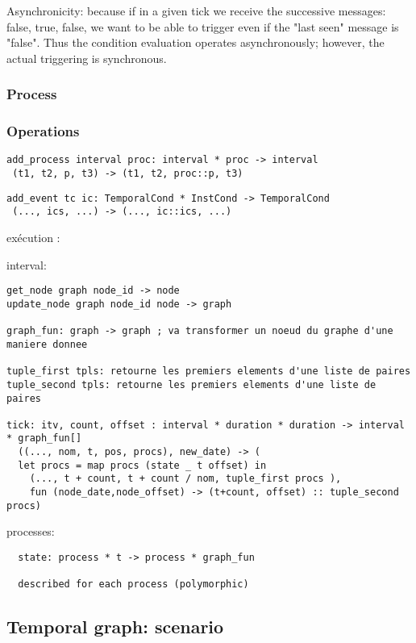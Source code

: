 \documentclass[applsci,article,submit,moreauthors,pdftex,10pt,a4paper]{mdpi}
\begin{document}
Asynchronicity: because if in a given tick we receive the successive messages: false, true, false, we want to be able to trigger even if the "last seen" message is "false".
Thus the condition evaluation operates asynchronously; however, the actual triggering is synchronous.

\subsubsection{Process}

\subsubsection{Operations}
\begin{lstlisting}
add_process interval proc: interval * proc -> interval
 (t1, t2, p, t3) -> (t1, t2, proc::p, t3)
\end{lstlisting}

\begin{lstlisting}
add_event tc ic: TemporalCond * InstCond -> TemporalCond
 (..., ics, ...) -> (..., ic::ics, ...)
\end{lstlisting}

exécution : 

interval: 

\begin{lstlisting}
get_node graph node_id -> node
update_node graph node_id node -> graph

graph_fun: graph -> graph ; va transformer un noeud du graphe d'une maniere donnee

tuple_first tpls: retourne les premiers elements d'une liste de paires
tuple_second tpls: retourne les premiers elements d'une liste de paires

tick: itv, count, offset : interval * duration * duration -> interval * graph_fun[]
  ((..., nom, t, pos, procs), new_date) -> (
  let procs = map procs (state _ t offset) in 
    (..., t + count, t + count / nom, tuple_first procs ),  
    fun (node_date,node_offset) -> (t+count, offset) :: tuple_second procs)
\end{lstlisting}

processes:
\begin{lstlisting}
  state: process * t -> process * graph_fun
  
  described for each process (polymorphic)
\end{lstlisting}

\subsection{Temporal graph: scenario}
\end{document}
